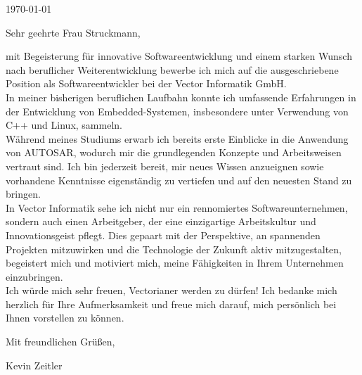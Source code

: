 \documentclass[10pt, a4paper]{article}
\begin{document}
\makeprofile %

\makecontact %

\today %

\makeemployerinfo %

Sehr geehrte Frau Struckmann,

mit Begeisterung für innovative Softwareentwicklung und einem starken Wunsch nach beruflicher Weiterentwicklung
bewerbe ich mich auf die ausgeschriebene Position als Softwareentwickler bei der Vector Informatik GmbH.
\\In meiner bisherigen beruflichen Laufbahn konnte ich umfassende Erfahrungen in der Entwicklung von Embedded-Systemen,
insbesondere unter Verwendung von C++ und Linux, sammeln.
\\Während meines Studiums erwarb ich bereits erste Einblicke
in die Anwendung von AUTOSAR, wodurch mir die grundlegenden Konzepte und Arbeitsweisen vertraut sind.
Ich bin jederzeit bereit, mir neues Wissen anzueignen sowie vorhandene Kenntnisse eigenständig zu vertiefen und auf den neuesten Stand zu bringen.
\\In Vector Informatik sehe ich nicht nur ein rennomiertes Softwareunternehmen, sondern auch einen Arbeitgeber, der eine einzigartige Arbeitskultur und Innovationsgeist pflegt. Dies gepaart mit der Perspektive, an spannenden Projekten mitzuwirken und die Technologie der Zukunft aktiv mitzugestalten, begeistert mich und motiviert mich, meine Fähigkeiten in Ihrem Unternehmen einzubringen.
\\Ich würde mich sehr freuen, Vectorianer werden zu dürfen!
Ich bedanke mich herzlich für Ihre Aufmerksamkeit und freue mich darauf, mich persönlich bei Ihnen vorstellen zu können.




Mit freundlichen Grüßen,

Kevin Zeitler
\end{document}
